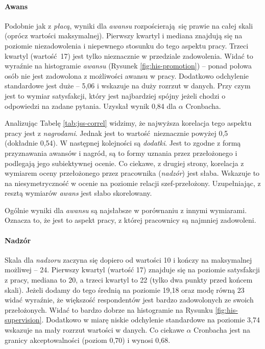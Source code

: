 \paragraph{Awans} Podobnie jak z \textit{płacą}, wyniki dla \emph{awansu} rozpościerają się prawie na całej skali (oprócz wartości maksymalnej). Pierwszy kwartyl i mediana znajdują się na poziomie niezadowolenia i niepewnego stosunku do tego aspektu pracy. Trzeci kwartyl (wartość 17) jest tylko nieznacznie w przedziale zadowolenia. Widać to wyraźnie na histogramie \emph{awansu} (Rysunek \ref{fig:his-promotion}) -- ponad połowa osób nie jest zadowolona
z możliwości awansu w pracy. Dodatkowo odchylenie standardowe jest duże -- 5,06 i wskazuje na duży rozrzut w danych. Przy czym jest to wymiar satysfakcji, który jest najbardziej spójny jeżeli chodzi o odpowiedzi na zadane pytania. Uzyskał wynik 0,84 dla $\alpha$ Cronbacha.

Analizując Tabelę \ref{tab:jss-correl} widzimy, że najwyższa korelacja tego aspektu pracy jest z \textit{nagrodami}. Jednak jest to wartość nieznacznie powyżej 0,5 (dokładnie 0,54). W następnej kolejności są \emph{dodatki}. Jest to zgodne z formą przyznawania awansów i nagród, są to formy uznania przez przełożonego i podlegają jego subiektywnej ocenie. Co ciekawe, z drugiej strony, korelacja z wymiarem oceny przełożonego  przez pracownika (\emph{nadzór}) jest słaba. Wskazuje to na niesymetryczność w
ocenie na poziomie relacji szef-przełożony. Uzupełniając, z resztą wymiarów \textit{awans} jest słabo skorelowany. 

Ogólnie wyniki dla \textit{awansu} są najsłabsze w porównaniu z innymi wymiarami. Oznacza to, że jest to aspekt pracy, z której pracownicy są najmniej zadowoleni.

\paragraph{Nadzór} Skala dla \textit{nadzoru} zaczyna się dopiero od wartości 10 i kończy na maksymalnej możliwej -- 24. Pierwszy kwartyl (wartość 17) znajduje się na poziomie satysfakcji z pracy, mediana to 20, a trzeci kwartyl to 22 (tylko dwa punkty przed końcem skali). Jeżeli dodamy do tego średnią na poziomie 19,18 oraz modę równą 23 widać wyraźnie, że większość respondentów jest bardzo zadowolonych ze swoich przełożonych. Widać to bardzo dobrze na histogramie na Rysunku
\ref{fig:his-supervision}. Dodatkowo w miarę niskie odchylenie standardowe
na poziomie 3,74 wskazuje na mały rozrzut wartości w danych. Co ciekawe $\alpha$ Cronbacha jest na granicy akceptowalności (poziom 0,70) i wynosi 0,68.

